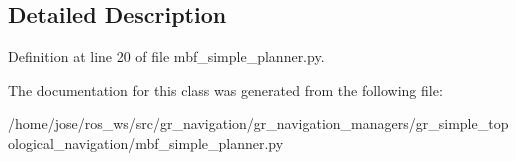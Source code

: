 \subsection{Detailed Description}


Definition at line 20 of file mbf\+\_\+simple\+\_\+planner.\+py.



The documentation for this class was generated from the following file\+:\begin{DoxyCompactItemize}
\item 
/home/jose/ros\+\_\+ws/src/gr\+\_\+navigation/gr\+\_\+navigation\+\_\+managers/gr\+\_\+simple\+\_\+topological\+\_\+navigation/mbf\+\_\+simple\+\_\+planner.\+py\end{DoxyCompactItemize}
